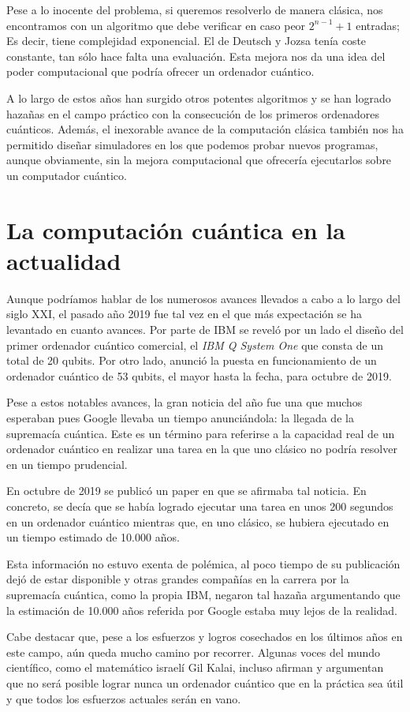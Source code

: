 Pese a lo inocente del problema, si queremos resolverlo de manera clásica, nos encontramos con un algoritmo que debe verificar en caso peor $2^{n-1}+1$ entradas; Es decir, tiene complejidad exponencial. El de Deutsch y Jozsa tenía coste constante, tan sólo hace falta una evaluación. Esta mejora nos da una idea del poder computacional que podría ofrecer un ordenador cuántico.

A lo largo de estos años han surgido otros potentes algoritmos y se han logrado hazañas en el campo práctico con la consecución de los primeros ordenadores cuánticos. Además, el inexorable avance de la computación clásica también nos ha permitido diseñar simuladores en los que podemos probar nuevos programas, aunque obviamente, sin la mejora computacional que ofrecería ejecutarlos sobre un computador cuántico.

\section{La computación cuántica en la actualidad}
Aunque podríamos hablar de los numerosos avances llevados a cabo a lo largo del siglo XXI, el pasado año 2019 fue tal vez en el que más expectación se ha levantado en cuanto avances. Por parte de IBM se reveló por un lado el diseño del primer ordenador cuántico comercial, el \textit{IBM Q System One} que consta de un total de 20 qubits. Por otro lado, anunció la puesta en funcionamiento de un ordenador cuántico de 53 qubits, el mayor hasta la fecha, para octubre de 2019.

Pese a estos notables avances, la gran noticia del año fue una que muchos esperaban pues Google llevaba un tiempo anunciándola: la llegada de la supremacía cuántica. Este es un término para referirse a la capacidad real de un ordenador cuántico en realizar una tarea en la que uno clásico no podría resolver en un tiempo prudencial.

En octubre de 2019 se publicó un paper\autocite{arute2019quantum} en que se afirmaba tal noticia. En concreto, se decía que se había logrado ejecutar una tarea en unos 200 segundos en un ordenador cuántico mientras que, en uno clásico, se hubiera ejecutado en un tiempo estimado de 10.000 años.

Esta información no estuvo exenta de polémica, al poco tiempo de su publicación dejó de estar disponible y otras grandes compañías en la carrera por la supremacía cuántica, como la propia IBM, negaron tal hazaña argumentando que la estimación de 10.000 años referida por Google estaba muy lejos de la realidad.

Cabe destacar que, pese a los esfuerzos y logros cosechados en los últimos años en este campo, aún queda mucho camino por recorrer. Algunas voces del mundo científico, como el matemático israelí Gil Kalai, incluso afirman y argumentan que no será posible lograr nunca un ordenador cuántico que en la práctica sea útil y que todos los esfuerzos actuales serán en vano.\autocite{kalai2011quantum}